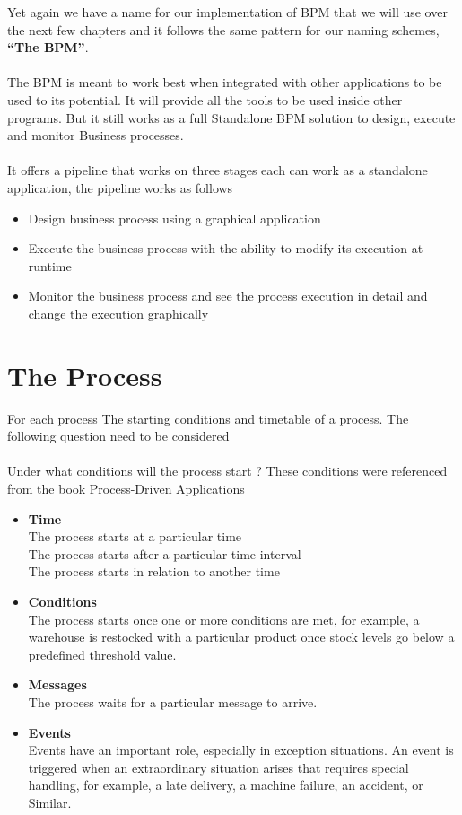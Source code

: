 Yet again we have a name for our implementation of BPM that we will use over the next few chapters
and it follows the same pattern for our naming schemes, \textbf{“The BPM”}.\\\\
The BPM is meant to work best when integrated with other applications to be used to its potential. It
will provide all the tools to be used inside other programs. But it still works as a full Standalone BPM
solution to design, execute and monitor Business processes.\\\\
It offers a pipeline that works on three stages each can work as a standalone application, the pipeline
works as follows
\begin{itemize}
    \item Design business process using a graphical application
    \item Execute the business process with the ability to modify its execution at runtime
    \item Monitor the business process and see the process execution in detail and change the execution
    graphically
\end{itemize}

\section{The Process}

For each process The starting conditions and timetable of a process. The following question need to be considered\\\\
Under what conditions will the process start ? These conditions were referenced from the book Process-Driven Applications \cite{processbpmn}\\
\begin{itemize}
    \item \textbf{Time}\\
    The process starts at a particular time\\
    The process starts after a particular time interval\\
    The process starts in relation to another time\\
    \item \textbf{Conditions}\\
    The process starts once one or more conditions are met, for example, a
    warehouse is restocked with a particular product once stock levels go
    below a predefined threshold value.
    \item \textbf{Messages}\\
    The process waits for a particular message to arrive.
    \item \textbf{Events}\\
    Events have an important role, especially in exception situations. An event
is triggered when an extraordinary situation arises that requires special handling, for example, a late delivery, a machine failure, an accident, or Similar.
\end{itemize}

